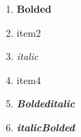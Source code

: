 \documentclass{article}
\begin{document}
    \begin{enumerate}
        \item \textbf{Bolded}
        \item item2
        \item \textit{italic}
        \item item4
        \item \textbf{\textit{Boldeditalic}}
        \item \textit{\textbf{italicBolded}}
    \end{enumerate}
\end{document}

